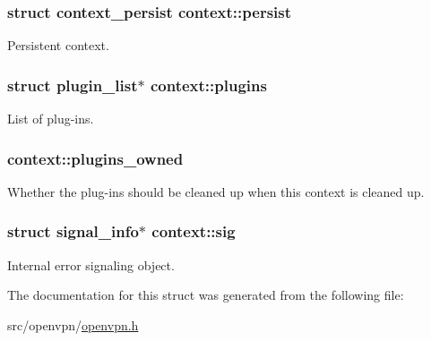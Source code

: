 \subsubsection[{persist}]{\setlength{\rightskip}{0pt plus 5cm}struct {\bf context\+\_\+persist} context\+::persist}\label{structcontext_af52fc5d2e241fbee78d2216e9ff7ed72}
Persistent context. \hypertarget{structcontext_a7ebcb36e0e5cab031f1f3721ee39b9d3}{}
\subsubsection[{plugins}]{\setlength{\rightskip}{0pt plus 5cm}struct {\bf plugin\+\_\+list}$\ast$ context\+::plugins}\label{structcontext_a7ebcb36e0e5cab031f1f3721ee39b9d3}
List of plug-\/ins. \hypertarget{structcontext_ab86d3cd4769ad44ed77c04c13c5382fb}{}
\subsubsection[{plugins\+\_\+owned}]{ context\+::plugins\+\_\+owned}\label{structcontext_ab86d3cd4769ad44ed77c04c13c5382fb}
Whether the plug-\/ins should be cleaned up when this context is cleaned up. \hypertarget{structcontext_a4a8aea25993019921e9568f611106773}{}
\subsubsection[{sig}]{\setlength{\rightskip}{0pt plus 5cm}struct {\bf signal\+\_\+info}$\ast$ context\+::sig}\label{structcontext_a4a8aea25993019921e9568f611106773}
Internal error signaling object. 

The documentation for this struct was generated from the following file\+:\begin{DoxyCompactItemize}
\item 
src/openvpn/\hyperlink{openvpn_8h}{openvpn.\+h}\end{DoxyCompactItemize}
